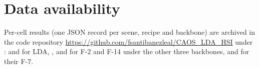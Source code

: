 \documentclass[journal,a4paper,10pt]{IEEEtran}
\begin{document}
\section*{Data availability}

{\raggedright
Per-cell results (one JSON record per scene, recipe and backbone) are
archived in the code repository
\url{https://github.com/fsantibanezleal/CAOS_LDA_HSI} under
:  and
 for LDA, ,
 and  for F-2 and F-14
under the other three backbones, and  for their
F-7.\par}



\end{document}
